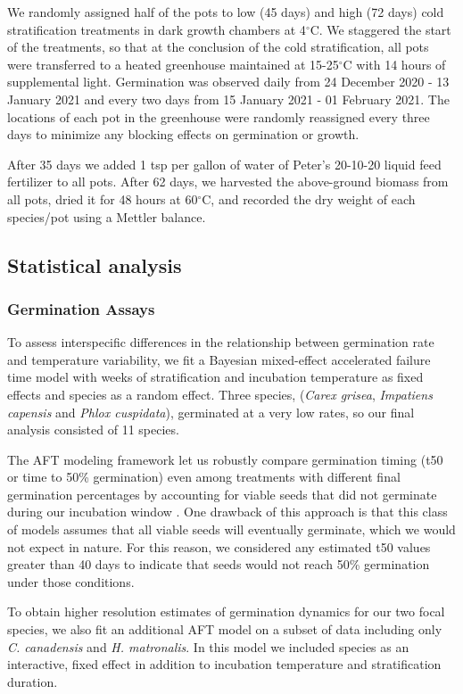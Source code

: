 \documentclass{article}[11pt]
\begin{document}
\noindent We randomly assigned half of the pots to low (45 days) and high (72 days) cold stratification treatments in dark growth chambers at 4$^{\circ}$C. We staggered the start of the treatments, so that at the conclusion of the cold stratification, all pots were transferred to a heated greenhouse maintained at 15-25$^{\circ}$C with 14 hours of supplemental light. Germination was observed daily from 24 December 2020 - 13 January 2021 and every two days from 15 January 2021 - 01 February 2021. The locations of each pot in the greenhouse were randomly reassigned every three days to minimize any blocking effects on germination or growth.

\noident After 35 days we added 1 tsp per gallon of water of Peter’s 20-10-20 liquid feed fertilizer to all pots. After 62 days, we harvested the above-ground biomass from all pots, dried it for 48 hours at 60$^{\circ}$C, and recorded the dry weight of each species/pot using a Mettler balance.

\subsection*{Statistical analysis}
\subsubsection*{Germination Assays}
To assess interspecific differences in the relationship between germination rate and temperature variability, we fit a Bayesian mixed-effect accelerated failure time model \citep[AFT,][]{ONOFRI:2010tl} with weeks of stratification and incubation temperature as fixed effects and species as a random effect. Three species, (\textit{Carex grisea}, \textit{Impatiens capensis} and \textit{Phlox cuspidata}), germinated at a very low rates, so our final analysis consisted of 11 species.

The AFT modeling framework let us robustly compare germination timing (t50 or time to 50\% germination) even among treatments with different final germination percentages by accounting for viable seeds that did not germinate during our incubation window \citep{Soltani:2015aa,ONOFRI:2010tl}. One drawback of this approach is that this class of models assumes that all viable seeds will eventually germinate, which we would not expect in nature. For this reason, we considered any estimated t50 values greater than 40 days to indicate that seeds would not reach 50\% germination under those conditions.  

To obtain higher resolution estimates of germination dynamics for our two focal species, we also fit an additional AFT model on a subset of data including only \textit{C. canadensis} and \textit{H. matronalis}. In this model we included species as an interactive, fixed effect in addition to incubation temperature and stratification duration. 
\end{document}
